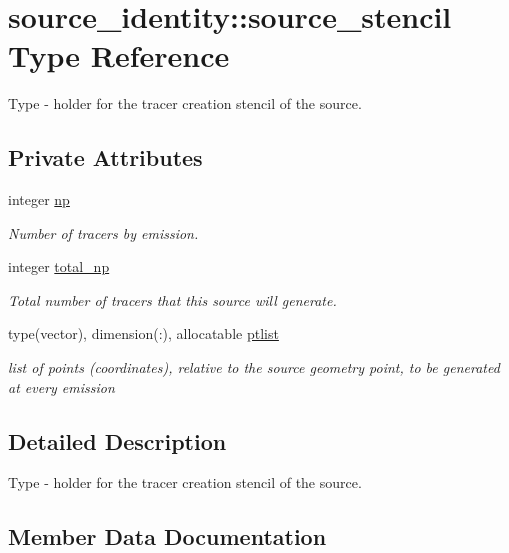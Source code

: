 \hypertarget{structsource__identity_1_1source__stencil}{}\section{source\+\_\+identity\+:\+:source\+\_\+stencil Type Reference}
\label{structsource__identity_1_1source__stencil}


Type -\/ holder for the tracer creation stencil of the source.  


\subsection*{Private Attributes}
\begin{DoxyCompactItemize}
\item 
integer \hyperlink{structsource__identity_1_1source__stencil_a2d71d3aefbd9e69874f490ddae97ce64}{np}
\begin{DoxyCompactList}\small\item\em Number of tracers by emission. \end{DoxyCompactList}\item 
integer \hyperlink{structsource__identity_1_1source__stencil_a11f7462457253157db252466b51000f2}{total\+\_\+np}
\begin{DoxyCompactList}\small\item\em Total number of tracers that this source will generate. \end{DoxyCompactList}\item 
type(vector), dimension(\+:), allocatable \hyperlink{structsource__identity_1_1source__stencil_a91822da10e869f72071fa29e2bb2c080}{ptlist}
\begin{DoxyCompactList}\small\item\em list of points (coordinates), relative to the source geometry point, to be generated at every emission \end{DoxyCompactList}\end{DoxyCompactItemize}


\subsection{Detailed Description}
Type -\/ holder for the tracer creation stencil of the source. 

\subsection{Member Data Documentation}
\mbox{\label{structsource__identity_1_1source__stencil_a2d71d3aefbd9e69874f490ddae97ce64}} 
